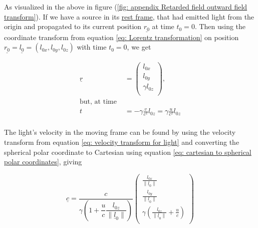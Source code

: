 \begin{derivation}

	As visualized in the above in figure (\ref{fig: appendix Retarded field outward field transform}).
	If we have a source in its \hyperlink{def-proper-frame}{rest frame}, that had emitted light from the origin and propagated to its current position $\underline{r_0}$ at time ${t_0} = 0$.
	Then using the coordinate transform from equation \eqref{eq: Lorentz transformation} on position $\underline{r_0}=\underline{l_0}=(l_{0x},l_{0y},l_{0z})$ with time ${t_0} = 0$, we get

	\begin{equation}
		\label{eq: displacement transform}
		\begin{aligned}
			\underline{r} & =
			\begin{pmatrix}
				l_{0x}          \\
				l_{0y}          \\
				{\gamma} l_{0z} \\
			\end{pmatrix},                                                                         \\
			\text{but, at time \ \ \ }                                                              \\
			{t}           & =-{\gamma} \frac{{v}}{{c}^2}{l_{0z}} = {\gamma} \frac{u}{{c}^2}{l_{0z}} \\
		\end{aligned}
	\end{equation}

	The light's velocity in the moving frame can be found by using the velocity transform from equation \eqref{eq: velocity transform for light} and converting the spherical polar coordinate to Cartesian using equation \eqref{eq: cartesian to spherical polar coordinates}, giving

	\begin{equation}
		\label{eq: light pulse velocity transform}
		\underline{c} =
		\dfrac{c}{\gamma \left(1 + \dfrac{u}{c} \dfrac{l_{0z}}{\|\underline{l}_0\|} \right)}
		\begin{pmatrix}
			\frac{l_{0x}}{\|\underline{l}_0\|}                                      \\
			\frac{l_{0y}}{\|\underline{l}_0\|}                                      \\
			\gamma \left( \frac{l_{0z}}{\|\underline{l}_0\|} + \frac{u}{c}  \right) \\
		\end{pmatrix}
	\end{equation}


\end{derivation}
